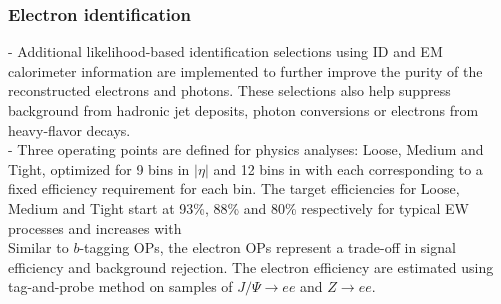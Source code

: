 \documentclass[../thesis.tex]{subfiles}
\begin{document}
\subsubsection*{Electron identification}
- Additional likelihood-based identification selections using ID and EM calorimeter information are implemented to further improve the purity of the reconstructed electrons and photons. These selections also help suppress background from hadronic jet deposits, photon conversions or electrons from heavy-flavor decays.\\
- Three operating points are defined for physics analyses: Loose, Medium and Tight, optimized for 9 bins in $|\eta|$ and 12 bins in \ET with each corresponding to a fixed efficiency requirement for each bin. The target efficiencies for Loose, Medium and Tight start at 93\%, 88\% and 80\% respectively for typical EW processes and increases with \ET \\ Similar to $b$-tagging OPs, the electron OPs represent a trade-off in signal efficiency and background rejection. The electron efficiency are estimated using tag-and-probe method \citep{reco:electron_id} on samples of $J/\Psi \rightarrow ee$ and $Z \rightarrow ee$\citep{reco:electron_meas}.
\end{document}
